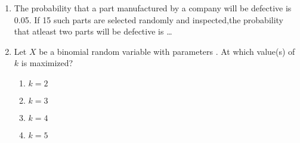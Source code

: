 \renewcommand{\theequation}{\theenumi}
\renewcommand{\thefigure}{\theenumi}
\renewcommand{\thetable}{\theenumi}
\begin{enumerate}[label=\thesection.\arabic*.,ref=\thesection.\theenumi]

\item The probability that a part manufactured by a company will be defective is 0.05. If 15 such parts are selected randomly and inspected,the probability that atleast two parts will be defective is \dots
%
\\
\solution
%

%
\item Let $X$ be a binomial random variable with parameters . At which value(s) of $k$ is  maximized?\\
\begin{enumerate}
\item $k=2$ 
\item $k=3$ 
\item $k=4$ 
\item $k=5$
\end{enumerate}
%
\solution
%


\end{enumerate}